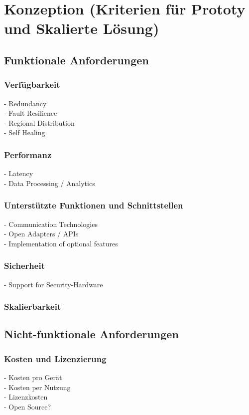 \chapter{Konzeption (Kriterien für Prototy und Skalierte Lösung)}\label{ch:Konzeption (Kriterien für Prototy und Skalierte Lösung)}
\section{Funktionale Anforderungen}\label{sec:Funktionale Anforderungen}
\subsection{Verfügbarkeit}\label{subsec:Verfügbarkeit}
- Redundancy\\
- Fault Resilience\\
- Regional Distribution\\
- Self Healing\\
\subsection{Performanz}\label{subsec:Performanz}
- Latency\\
- Data Processing / Analytics\\
\subsection{Unterstützte Funktionen und Schnittstellen}\label{subsec:Unterstützte Funktionen und Schnittstellen}
- Communication Technologies\\
- Open Adapters / APIs\\
- Implementation of optional features\\
\subsection{Sicherheit}\label{subsec:Sicherheit}
- Support for Security-Hardware\\
\subsection{Skalierbarkeit}\label{subsec:Skalierbarkeit}
\section{Nicht-funktionale Anforderungen}\label{sec:Nicht-funktionale Anforderungen}
\subsection{Kosten und Lizenzierung}\label{subsec:Kosten und Lizenzierung}
- Kosten pro Gerät\\
- Kosten per Nutzung\\
- Lizenzkosten\\
- Open Source?\\
